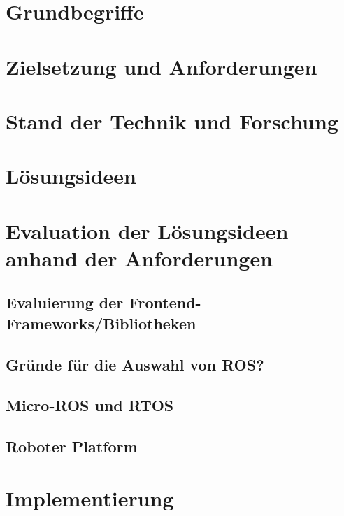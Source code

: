 \documentclass[11pt,oneside,a4paper,titlepage]{article}
\begin{document}
\section{Grundbegriffe}

\pagebreak

\section{Zielsetzung und Anforderungen}


\section{Stand der Technik und Forschung}


\section{Lösungsideen}


\section{Evaluation der Lösungsideen anhand der Anforderungen}

\subsection{Evaluierung der Frontend-Frameworks/Bibliotheken}


\subsection{Gründe für die Auswahl von ROS?}


\subsection{Micro-ROS und RTOS}


\subsection{Roboter Platform}


\section{Implementierung}
\end{document}
